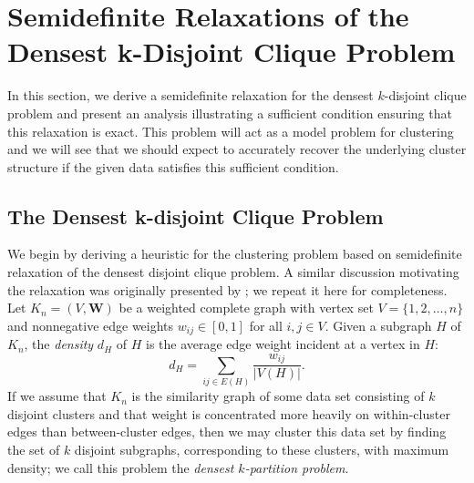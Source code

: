 \documentclass[twoside,11pt]{article}
\newcommand{\bs}{\boldsymbol}
\newcommand{\W}{\bs {W}}
\newcommand{\0}{\bs{0}}
\begin{document}
\section{Semidefinite Relaxations of the Densest k-Disjoint Clique Problem}

In this section, we derive a semidefinite relaxation for the densest \(k\)-disjoint clique problem
and present an analysis illustrating a sufficient condition ensuring that this relaxation
is exact. This problem will act as a model problem for clustering and we will see that
we should expect
to accurately recover the underlying cluster structure if the given data
satisfies this sufficient condition.

\subsection{The Densest k-disjoint Clique Problem}
\label{sec: kdc}
We begin by deriving a heuristic for the clustering problem based on semidefinite relaxation
of the densest disjoint clique problem.
A similar discussion motivating the relaxation was originally presented by \cite{ames2014guaranteed}; we repeat it here for completeness.
Let $K_n=(V, \W)$ be a weighted complete graph with vertex set
$V=\{1,2,\dots,n\}$ and nonnegative edge weights $w_{ij} \in [0,1]$ for all $i,j \in V$.
Given a subgraph \(H\) of \(K_n\), the \emph{density} \(d_H\) of \(H\)
is the average edge weight incident at a vertex in \(H\):
\[
d_H = \sum_{ij \in E(H)} \frac{w_{ij}}{|V(H)|}.
\]
If we assume that \(K_n\) is the similarity graph of some data set consisting
of \(k\) disjoint clusters and that weight
is concentrated more heavily on within-cluster edges than between-cluster
edges, then we may cluster this data set by finding the set of \(k\) disjoint
subgraphs, corresponding to these clusters, with maximum density;
we call this problem the \emph{densest \(k\)-partition problem}.
\end{document}
